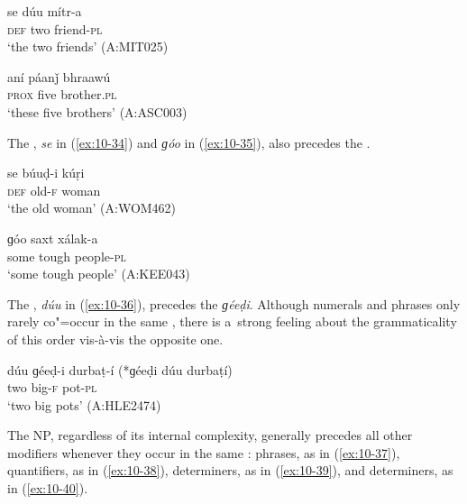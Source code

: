 \begin{exe}
\ex
\label{ex:10-32}
\gll se dúu mítr-a \\
\textsc{def} two friend-\textsc{pl} \\
\glt `the two friends' (A:MIT025)

\ex
\label{ex:10-33}
\gll aní páanǰ bhraawú \\
\textsc{prox} five brother.\textsc{pl}  \\
\glt `these five brothers' (A:ASC003)
\end{exe}

The , \textit{se} in (\ref{ex:10-34}) and \textit{ɡóo} in (\ref{ex:10-35}), also precedes the  .

\begin{exe}
\ex
\label{ex:10-34}
\gll se búuḍ-i kúṛi \\
\textsc{def} old-\textsc{f} woman \\
\glt `the old woman' (A:WOM462)

\ex
\label{ex:10-35}
\gll ɡóo saxt xálak-a \\
some tough people-\textsc{pl}  \\
\glt `some tough people' (A:KEE043)
\end{exe}


The , \textit{dúu} in (\ref{ex:10-36}), precedes the   \textit{ɡéeḍi}. Although numerals and  phrases only rarely co"=occur in the same  , there is a~strong feeling about the grammaticality of this order vis-à-vis the opposite one.

\begin{exe}
\ex
\label{ex:10-36}
\gll dúu ɡéeḍ-i durbaṭ-í (*ɡéeḍi dúu durbaṭí) \\
two big-\textsc{f} pot-\textsc{pl} \\
\glt `two big pots' (A:HLE2474)
\end{exe}


The  NP, regardless of its internal complexity, generally precedes all other modifiers
whenever they occur in the same  :  phrases, as in (\ref{ex:10-37}), quantifiers, as in (\ref{ex:10-38}),  determiners, as in (\ref{ex:10-39}), and  determiners, as in
(\ref{ex:10-40}).

